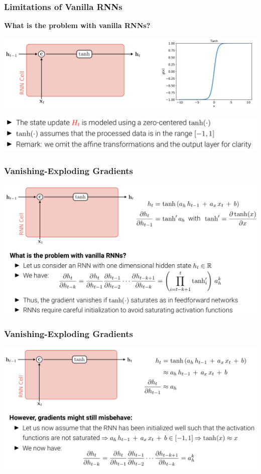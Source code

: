 \documentclass[10pt]{beamer}
\begin{document}
\begin{frame}
  \frametitle{Limitations of Vanilla RNNs}
\textbf{What is the problem with vanilla RNNs?}
\begin{center}
\includegraphics[width=.9\textwidth]{images/s11}
\end{center}
\vspace{-.25cm}
\begin{center}
\includegraphics[width=.85\textwidth]{images/s12}
\end{center}
\end{frame}

\begin{frame}
  \frametitle{Vanishing-Exploding Gradients}
\begin{center}
\includegraphics[width=.95\textwidth]{images/s13}
\end{center}
\end{frame}

\begin{frame}
  \frametitle{Vanishing-Exploding Gradients}
\begin{center}
\includegraphics[width=.95\textwidth]{images/s14}
\end{center}
\end{frame}
\end{document}
